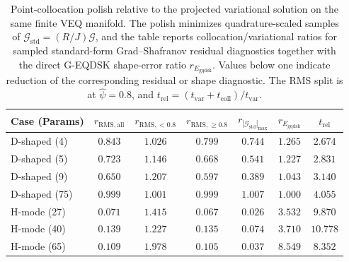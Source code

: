 \documentclass[final, 3p, times]{elsarticle}
\newcommand{\tableformat}{\centering\small}
\begin{document}
\begin{table}[tb]
    \caption{Point-collocation polish relative to the projected variational solution on the same finite VEQ manifold. The polish minimizes quadrature-scaled samples of $\mathcal{G}_{\mathrm{std}}=(R/J)\mathcal{G}$, and the table reports collocation/variational ratios for sampled standard-form Grad--Shafranov residual diagnostics together with the direct G-EQDSK shape-error ratio $r_{E_{\mathrm{gqdsk}}}$. Values below one indicate reduction of the corresponding residual or shape diagnostic. The RMS split is at $\hat{\psi}=0.8$, and $t_{\mathrm{rel}}=(t_{\mathrm{var}}+t_{\mathrm{coll}})/t_{\mathrm{var}}$.}
    \tableformat
    \begin{tabular}{l c c c c c c}
        \hline
        Case (Params) & $r_{\mathrm{RMS,all}}$ & $r_{\mathrm{RMS},<0.8}$ & $r_{\mathrm{RMS},\geq0.8}$ & $r_{|\mathcal{G}_{\mathrm{std}}|_{\max}}$ & $r_{E_{\mathrm{gqdsk}}}$ & $t_{\mathrm{rel}}$ \\
        \hline
        D-shaped (4)  & $0.843$                & $1.026$                 & $0.799$                    & $0.744$                                   & $1.265$                  & $2.674$            \\
        D-shaped (5)  & $0.723$                & $1.146$                 & $0.668$                    & $0.541$                                   & $1.227$                  & $2.831$            \\
        D-shaped (9)  & $0.650$                & $1.207$                 & $0.597$                    & $0.389$                                   & $1.043$                  & $3.140$            \\
        D-shaped (75) & $0.999$                & $1.001$                 & $0.999$                    & $1.007$                                   & $1.000$                  & $4.055$            \\
        H-mode (27)   & $0.071$                & $1.415$                 & $0.067$                    & $0.026$                                   & $3.532$                  & $9.870$            \\
        H-mode (40)   & $0.139$                & $1.227$                 & $0.135$                    & $0.074$                                   & $3.710$                  & $10.778$           \\
        H-mode (65)   & $0.109$                & $1.978$                 & $0.105$                    & $0.037$                                   & $8.549$                  & $8.352$            \\

\end{tabular}
\end{table}
\end{document}
